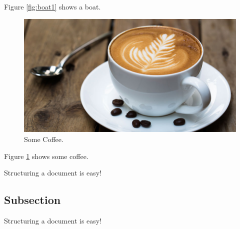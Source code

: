 \documentclass{article}
\begin{document}
Figure \ref{fig:boat1} shows a boat.

\begin{figure}
  \includegraphics[width=\linewidth]{coffee.jpg}
  \caption{Some Coffee.}
  \label{fig:coffee1}
\end{figure}

Figure \ref{fig:coffee1} shows some coffee.

Structuring a document is easy!

\subsection{Subsection}

Structuring a document is easy!
\end{document}
